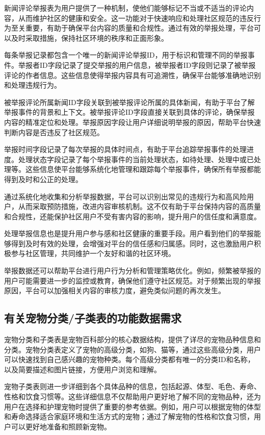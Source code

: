 新闻评论举报表为用户提供了一种机制，使他们能够标记不当或不适当的评论内容，从而维护社区的健康和安全。这一功能对于快速响应和处理社区规范的违反行为至关重要，有助于确保平台内容的质量和合规性。通过有效的举报处理，平台可以及时采取措施，保持社区环境的秩序和正面形象。

每条举报记录都包含一个唯一的新闻评论举报ID，用于标识和管理不同的举报事件。举报者ID字段记录了提交举报的用户信息，被举报者ID字段则记录了被举报评论的作者信息。这些信息使得举报内容具有可追溯性，确保平台能够准确地识别和处理违规行为。

被举报评论所属新闻ID字段关联到被举报评论所属的具体新闻，有助于平台了解举报事件的背景和上下文。被举报评论ID字段直接关联到具体的评论，确保举报内容的精准定位和处理。举报原因字段让用户详细说明举报的原因，帮助平台快速判断内容是否违反了社区规范。

举报时间字段记录了每次举报的具体时间点，有助于平台追踪举报事件的处理进度。处理状态字段记录了每个举报事件的当前处理状态，如待处理、处理中或已处理等。这些信息使平台能够系统化地管理和跟踪每个举报事件，确保所有举报都能得到及时和公正的处理。

通过系统化地收集和分析举报数据，平台可以识别出常见的违规行为和高风险用户，从而采取预防措施，改进内容审核机制。这不仅有助于平台保持内容的高质量和合规性，还能保护社区用户不受有害内容的影响，提升用户的信任度和满意度。

处理举报信息也是提升用户参与感和社区健康的重要手段。用户看到他们的举报能够得到及时有效的处理，会增强对平台的信任感和归属感。同时，这也激励用户积极参与社区管理，共同维护一个友好和谐的社区环境。

举报数据还可以帮助平台进行用户行为分析和管理策略优化。例如，频繁被举报的用户可能需要进一步的监控或教育，确保他们遵守社区规范。对于频繁出现的举报原因，平台可以加强相关内容的审核力度，避免类似问题的再次发生。

\subsection{有关宠物分类/子类表的功能数据需求}

宠物分类和子类表是宠物百科部分的核心数据结构，提供了详尽的宠物品种信息和分类。宠物分类表定义了宠物的高级分类，如狗、猫等，通过这些高级分类，用户可以快速找到自己感兴趣的宠物种类。每个高级分类都有唯一的分类ID和名称，以及简要描述和图片链接，方便用户浏览和理解。

宠物子类表则进一步详细到各个具体品种的信息，包括起源、体型、毛色、寿命、性格和饮食习惯等。这些详细信息不仅帮助用户更好地了解不同的宠物品种，还为用户在选择和护理宠物时提供了重要的参考依据。例如，用户可以根据宠物的体型和寿命选择适合家庭环境和生活方式的宠物；通过了解宠物的性格和饮食习惯，用户可以更好地准备和照顾新宠物。

